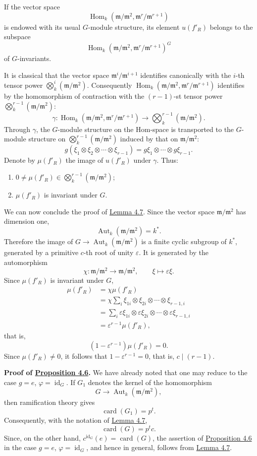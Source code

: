 \documentclass[11pt]{article}
\providecommand{\fm}{\mathfrak{m}}
\DeclareMathOperator{\Hom}{Hom}
\providecommand{\id}{\operatorname{id}}
\providecommand{\Hom}{\operatorname{Hom}}
\providecommand{\id}{\operatorname{id}}
\providecommand{\id}{\operatorname{id}}
\providecommand{\Aut}{\operatorname{Aut}}
\providecommand{\id}{\operatorname{id}}
\providecommand{\id}{\operatorname{id}}
\providecommand{\fm}{\mathfrak m}
\providecommand{\card}{\operatorname{card}}
\providecommand{\Aut}{\operatorname{Aut}}
\providecommand{\Hom}{\operatorname{Hom}}
\providecommand{\id}{\operatorname{id}}
\begin{document}
If the vector space
\[
\Hom_k(\fm/\fm^2,\fm^r/\fm^{r+1})
\]
is endowed with its usual $G$-module structure, its element $u(f'_R)$
belongs to the subspace
\[
\Hom_k(\fm/\fm^2,\fm^r/\fm^{r+1})^G
\]
of $G$-invariants.

It is classical that the vector space $\fm^i/\fm^{i+1}$ identifies
canonically with the $i$-th tensor power
$\bigotimes_k^i(\fm/\fm^2)$. Consequently
$\Hom_k(\fm/\fm^2,\fm^r/\fm^{r+1})$ identifies by the homomorphism of
contraction with the $(r-1)$-st tensor power
$\bigotimes_k^{r-1}(\fm/\fm^2)$:
\[
\gamma:\Hom_k(\fm/\fm^2,\fm^r/\fm^{r+1})
\longrightarrow\bigotimes_k^{r-1}(\fm/\fm^2).
\]
Through $\gamma$, the $G$-module structure on the Hom-space is
transported to the $G$-module structure on
$\bigotimes_k^{r-1}(\fm/\fm^2)$ induced by that on $\fm/\fm^2$:
\[
g(\xi_1\otimes\xi_2\otimes\cdots\otimes\xi_{r-1})
=g\xi_1\otimes\cdots\otimes g\xi_{r-1}.
\]
Denote by $\mu(f'_R)$ the image of $u(f'_R)$ under $\gamma$. Thus:
\begin{enumerate}
\item[I)] $0\ne\mu(f'_R)\in\bigotimes_k^{r-1}(\fm/\fm^2)$;
\item[II)] $\mu(f'_R)$ is invariant under $G$.
\end{enumerate}

We can now conclude the proof of \hyperref[sga5:XII:lemma:4.7]{Lemma 4.7}. Since the vector space
$\fm/\fm^2$ has dimension one,
\[
\Aut_k(\fm/\fm^2)=k^*.
\]
Therefore the image of $G\to\Aut_k(\fm/\fm^2)$ is a finite cyclic
subgroup of $k^*$, generated by a primitive $c$-th root of unity
$\varepsilon$. It is generated by the automorphism
\[
\chi:\fm/\fm^2\longrightarrow\fm/\fm^2,
\qquad \xi\longmapsto\varepsilon\xi.
\]
Since $\mu(f'_R)$ is invariant under $G$,
\[
\begin{aligned}
\mu(f'_R)
&=\chi\mu(f'_R)\\
&=\chi\sum_i\xi_{1i}\otimes\xi_{2i}\otimes\cdots\otimes\xi_{r-1,i}\\
&=\sum_i\varepsilon\xi_{1i}\otimes\varepsilon\xi_{2i}
  \otimes\cdots\otimes\varepsilon\xi_{r-1,i}\\
&=\varepsilon^{r-1}\mu(f'_R),
\end{aligned}
\]
that is,
\[
(1-\varepsilon^{r-1})\mu(f'_R)=0.
\]
Since $\mu(f'_R)\ne0$, it follows that
$1-\varepsilon^{r-1}=0$, that is, $c\mid(r-1)$.

\medskip
\noindent
\textbf{Proof of \hyperref[sga5:XII:proposition:4.6]{Proposition 4.6}.} We have already noted that one may reduce to the case $g=e$, $\varphi=\id_G$. If $G_1$ denotes the kernel of the homomorphism
\[
G\longrightarrow\Aut_k(\fm/\fm^2),
\]
then ramification theory gives
\[
\card(G_1)=p^t.
\]
Consequently, with the notation of \hyperref[sga5:XII:lemma:4.7]{Lemma 4.7},
\[
\card(G)=p^tc.
\]
Since, on the other hand, $c^{\id_G}(e)=\card(G)$, the assertion of \hyperref[sga5:XII:proposition:4.6]{Proposition 4.6} in the case $g=e$, $\varphi=\id_G$, and hence in general, follows from \hyperref[sga5:XII:lemma:4.7]{Lemma 4.7}.
\end{document}
